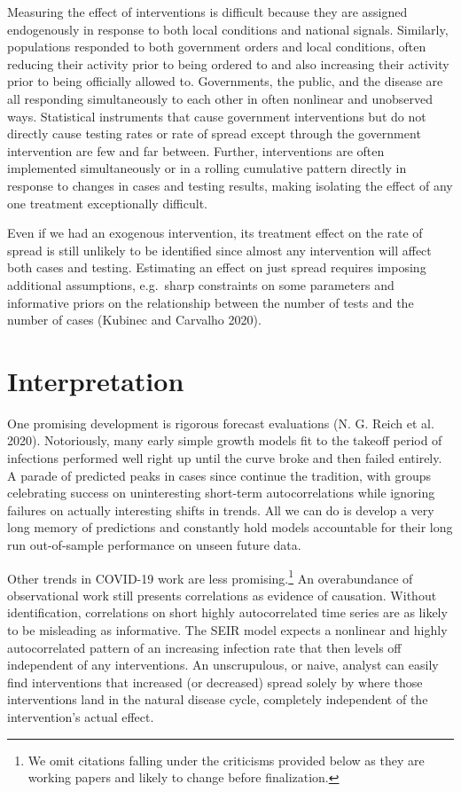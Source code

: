 \documentclass[10pt,letterpaper]{article}
\begin{document}
Measuring the effect of interventions is difficult because they are
assigned endogenously in response to both local conditions and national
signals. Similarly, populations responded to both government orders and
local conditions, often reducing their activity prior to being ordered
to and also increasing their activity prior to being officially allowed
to. Governments, the public, and the disease are all responding
simultaneously to each other in often nonlinear and unobserved ways.
Statistical instruments that cause government interventions but do not
directly cause testing rates or rate of spread except through the
government intervention are few and far between. Further, interventions
are often implemented simultaneously or in a rolling cumulative pattern
directly in response to changes in cases and testing results, making
isolating the effect of any one treatment exceptionally difficult.

Even if we had an exogenous intervention, its treatment effect on the
rate of spread is still unlikely to be identified since almost any
intervention will affect both cases and testing. Estimating an effect on
just spread requires imposing additional assumptions, e.g.~sharp
constraints on some parameters and informative priors on the
relationship between the number of tests and the number of cases
(Kubinec and Carvalho 2020).

\section{Interpretation}\label{interpretation}

One promising development is rigorous forecast evaluations (N. G. Reich
et al. 2020). Notoriously, many early simple growth models fit to the
takeoff period of infections performed well right up until the curve
broke and then failed entirely. A parade of predicted peaks in cases
since continue the tradition, with groups celebrating success on
uninteresting short-term autocorrelations while ignoring failures on
actually interesting shifts in trends. All we can do is develop a very
long memory of predictions and constantly hold models accountable for
their long run out-of-sample performance on unseen future data.

Other trends in COVID-19 work are less promising.\footnote{We omit
  citations falling under the criticisms provided below as they are
  working papers and likely to change before finalization.} An
overabundance of observational work still presents correlations as
evidence of causation. Without identification, correlations on short
highly autocorrelated time series are as likely to be misleading as
informative. The SEIR model expects a nonlinear and highly
autocorrelated pattern of an increasing infection rate that then levels
off independent of any interventions. An unscrupulous, or naive, analyst
can easily find interventions that increased (or decreased) spread
solely by where those interventions land in the natural disease cycle,
completely independent of the intervention's actual effect.
\end{document}
